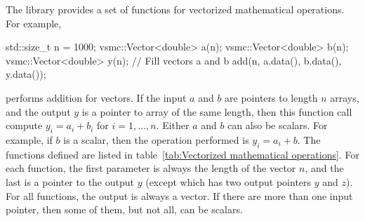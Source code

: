 The library provides a set of functions for vectorized mathematical operations.
For example,
\begin{cppcode}
  std::size_t n = 1000;
  vsmc::Vector<double> a(n);
  vsmc::Vector<double> b(n);
  vsmc::Vector<double> y(n);
  // Fill vectors a and b
  add(n, a.data(), b.data(), y.data());
\end{cppcode}
performs addition for vectors. If the input $a$ and $b$ are pointers to length
$n$ arrays, and the output $y$ is a pointer to array of the same length, then
this function call compute $y_i = a_i + b_i$ for $i=1,\dots,n$. Either $a$ and
$b$ can also be scalars. For example, if $b$ is a scalar, then the operation
performed is $y_i = a_i + b$. The functions defined are listed in
table~\ref{tab:Vectorized mathematical operations}. For each function, the
first parameter is always the length of the vector $n$, and the last is a
pointer to the output $y$ (except  which has two output
pointers $y$ and $z$). For all functions, the output is always a vector. If
there are more than one input pointer, then some of them, but not all, can be
scalars.
